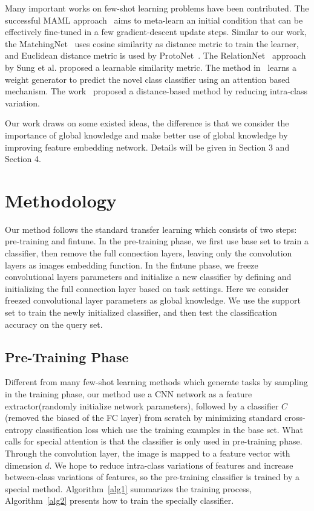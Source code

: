 \documentclass[runningheads]{llncs}
\begin{document}
Many important works on few-shot learning problems have been contributed. The successful MAML approach~\cite{finn2017model,nichol2018first} aims to meta-learn an initial condition that can be effectively fine-tuned in a few gradient-descent update steps. Similar to our work, the MatchingNet~\cite{vinyals2016matching} uses cosine similarity as distance metric to train the learner, and Euclidean distance metric is used by ProtoNet~\cite{snell2017prototypical}. The RelationNet~\cite{sung2018learning} approach by Sung et al. proposed a learnable similarity metric. The method in~\cite{gidaris2018dynamic} learns a weight generator to predict the novel class classifier using an attention based mechanism. The work~\cite{salimans2016weight} proposed a distance-based method by reducing intra-class variation.

Our work draws on some existed ideas, the difference is that we consider the importance of global knowledge and make better use of global knowledge by improving feature embedding network. Details will be given in Section 3 and Section 4.

\section{Methodology}
Our method follows the standard transfer learning which consists of two steps: pre-training and fintune. In the pre-training phase, we first use base set to train a classifier, then remove the full connection layers, leaving only the convolution layers as images embedding function. In the fintune phase, we freeze convolutional layers parameters and initialize a new classifier by defining and initializing the full connection layer based on task settings. Here we consider freezed convolutional layer parameters as global knowledge. We use the support set to train the newly initialized classifier, and then test the classification accuracy on the query set.
\subsection{Pre-Training Phase}
Different from many few-shot learning methods which generate tasks by sampling in the training phase, our method use a CNN network as a feature extractor(randomly initialize network parameters), followed by a classifier $C$(removed the biased of the FC layer) from scratch by minimizing standard cross-entropy classification loss which use the training examples in the base set. What calls for special attention is that the classifier is only used in pre-training phase. Through the convolution layer, the image is mapped to a feature vector with dimension $d$. We hope to reduce intra-class variations of features and increase between-class variations of features, so the pre-training classifier is trained by a special method. Algorithm~\ref{alg1} summarizes the training process, Algorithm~\ref{alg2} presents how to train the specially classifier.
\end{document}
